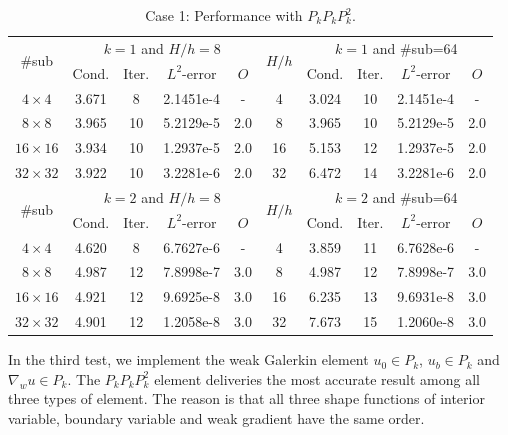 		\begin{table}[h]
			\small
			\vspace{-10pt}
			\setlength{\tabcolsep}{1pt} {
				\caption{Case 1: Performance with $P_{k}P_{k}P_{k}^2$.}
				\label{Tab:case1_PkPkPk}
				\vspace{-5pt}
				\begin{center}
					\begin{tabular}{c|cccc|c|cccc}
						\hline
						\multirow{2}{*}{\#sub} &\multicolumn{4}{c|}{$k=1$ and $H/h=8$} &\multirow{2}{*}{$H/h$} &\multicolumn{4}{c}{$k=1$ and \#sub=64}\\ 
						& Cond.   & Iter. &$L^2$-error & $O$  & & Cond.   & Iter. &$L^2$-error & $O$ \\
						\hline
						$4\times 4$     &3.671 & 8  &2.1451e-4 &- &4   &3.024 &10 &2.1451e-4 &- \\
						$8\times 8$     &3.965 &10 &5.2129e-5 &2.0  &8   &3.965 &10 &5.2129e-5 &2.0 \\
						$16\times 16$ &3.934 &10 &1.2937e-5 &2.0  &16 &5.153 &12 &1.2937e-5 &2.0 \\
						$32\times 32$ &3.922 &10 &3.2281e-6 &2.0  &32 &6.472 &14 &3.2281e-6 &2.0 \\
						\hline	
						\multirow{2}{*}{\#sub} &\multicolumn{4}{c|}{$k=2$ and $H/h=8$} &\multirow{2}{*}{$H/h$} &\multicolumn{4}{c}{$k=2$ and \#sub=64}\\ 
						& Cond.   & Iter. &$L^2$-error & $O$ & & Cond.   & Iter. &$L^2$-error & $O$ \\
						\hline
						$4\times 4$     &4.620 &8   &6.7627e-6 &-  & 4  &3.859 &11 &6.7628e-6 &- \\
						$8\times 8$     &4.987 &12 &7.8998e-7 &3.0  &8   &4.987 &12 &7.8998e-7 &3.0 \\
						$16\times 16$ &4.921 &12 &9.6925e-8 &3.0  &16 &6.235 &13 &9.6931e-8 &3.0 \\
						$32\times 32$ &4.901 &12 &1.2058e-8 &3.0  &32 &7.673 &15 &1.2060e-8 &3.0 \\
						\hline
					\end{tabular}
				\end{center} }
			\end{table}
			
			In the third test, we implement the weak Galerkin element $ u_{0} \in P_{k} $, $ u_{b} \in P_{k} $ and $ \nabla_{w} u \in P_{k} $. The $ P_k P_k P_k^2 $ element deliveries the most accurate result among all three types of element. The reason is that all three shape functions of interior variable, boundary variable and weak gradient have the same order. 
			

